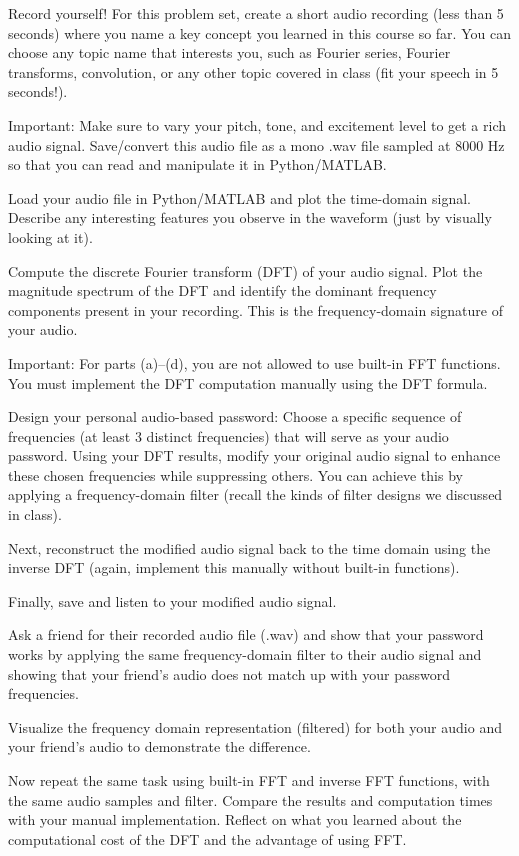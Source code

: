 \documentclass{ee102_pset}
\author{\rule{3cm}{0.4pt}}
\begin{document}

Record yourself! For this problem set, create a short audio recording (less than 5 seconds) where you name a key concept you learned in this course so far. You can choose any topic name that interests you, such as Fourier series, Fourier transforms, convolution, or any other topic covered in class (fit your speech in 5 seconds!).

Important: Make sure to vary your pitch, tone, and excitement level to get a rich audio signal. Save/convert this audio file as a mono .wav file sampled at 8000 Hz so that you can read and manipulate it in Python/MATLAB. 

\problempart [10 points]
Load your audio file in Python/MATLAB and plot the time-domain signal. Describe any interesting features you observe in the waveform (just by visually looking at it).

\problempart [30 points]
Compute the discrete Fourier transform (DFT) of your audio signal. Plot the magnitude spectrum of the DFT and identify the dominant frequency components present in your recording. This is the frequency-domain signature of your audio.

Important: For parts (a)--(d), you are not allowed to use built-in FFT functions. You must implement the DFT computation manually using the DFT formula.

\problempart [30 points]
Design your personal audio-based password: Choose a specific sequence of frequencies (at least 3 distinct frequencies) that will serve as your audio password. Using your DFT results, modify your original audio signal to enhance these chosen frequencies while suppressing others. You can achieve this by applying a frequency-domain filter (recall the kinds of filter designs we discussed in class).

Next, reconstruct the modified audio signal back to the time domain using the inverse DFT (again, implement this manually without built-in functions).

Finally, save and listen to your modified audio signal.

\newpage
\problempart [15 points]
Ask a friend for their recorded audio file (.wav) and show that your password works by applying the same frequency-domain filter to their audio signal and showing that your friend's audio does not match up with your password frequencies.

Visualize the frequency domain representation (filtered) for both your audio and your friend's audio to demonstrate the difference.

\problempart [15 points]
Now repeat the same task using built-in FFT and inverse FFT functions, with the same audio samples and filter. Compare the results and computation times with your manual implementation. Reflect on what you learned about the computational cost of the DFT and the advantage of using FFT.
\end{document}
